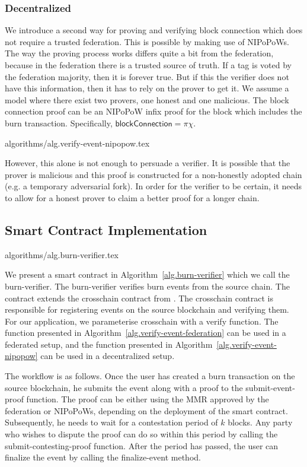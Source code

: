 \subsubsection{Decentralized}
We introduce a second way for proving and verifying block connection which does not require a trusted federation. This is possible by making use of NIPoPoWs. The way the proving process works differs quite a bit from the federation, because in the federation there is a trusted source of truth. If a tag is voted by the federation majority, then it is forever true. But if this the verifier does not have this information, then it has to rely on the prover to get it. We assume a model where there exist two provers, one honest and one malicious. The block connection proof can be an NIPoPoW infix proof for the block which includes the burn transaction. Specifically, $\mathsf{blockConnection} = \pi\chi$.

{algorithms/alg.verify-event-nipopow.tex}

However, this alone is not enough to persuade a verifier. It is possible that the prover is malicious and this proof is constructed for a non-honestly adopted chain (e.g. a temporary adversarial fork). In order for the verifier to be certain, it needs to allow for a honest prover to claim a better proof for a longer chain.

\subsection{Smart Contract Implementation}
{algorithms/alg.burn-verifier.tex}

We present a smart contract in Algorithm~\ref{alg.burn-verifier} which we call the \textsf{burn-verifier}. The \textsf{burn-verifier} verifies burn events from the source chain. The contract extends the \textsf{crosschain} contract from \cite{pow-sidechains}. The \textsf{crosschain} contract is responsible for registering events on the source blockchain and verifying them. For our application, we parameterise \textsf{crosschain} with a \textsf{verify} function. The function presented in Algorithm~\ref{alg.verify-event-federation} can be used in a federated setup, and the function presented in Algorithm~\ref{alg.verify-event-nipopow} can be used in a decentralized setup.

The workflow is as follows. Once the user has created a burn transaction on the source blockchain, he submits the event along with a proof to the \textsf{submit-event-proof} function. The proof can be either using the MMR approved by the federation or NIPoPoWs, depending on the deployment of the smart contract. Subsequently, he needs to wait for a contestation period of $k$ blocks. Any party who wishes to dispute the proof can do so within this period by calling the \textsf{submit-contesting-proof} function. After the period has passed, the user can finalize the event by calling the \textsf{finalize-event} method.

